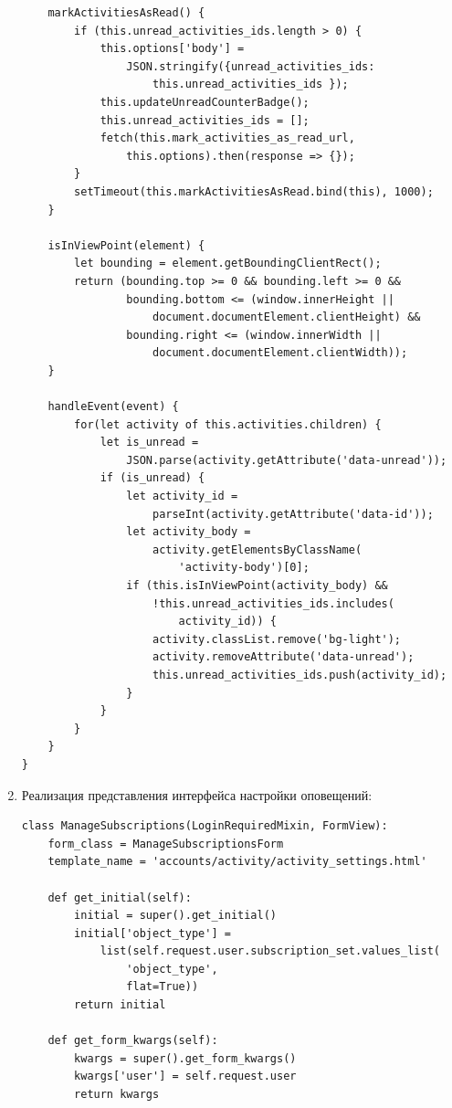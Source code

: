 \documentclass[12pt, a4paper, oneside]{article}
\begin{document}
\begin{enumerate}[wide, labelindent=0pt]
{\begin{verbatim}
    markActivitiesAsRead() {
        if (this.unread_activities_ids.length > 0) {
            this.options['body'] = 
                JSON.stringify({unread_activities_ids: 
                    this.unread_activities_ids });
            this.updateUnreadCounterBadge();
            this.unread_activities_ids = [];
            fetch(this.mark_activities_as_read_url, 
                this.options).then(response => {});
        }
        setTimeout(this.markActivitiesAsRead.bind(this), 1000);
    }

    isInViewPoint(element) {
        let bounding = element.getBoundingClientRect();
        return (bounding.top >= 0 && bounding.left >= 0 &&
                bounding.bottom <= (window.innerHeight || 
                    document.documentElement.clientHeight) &&
                bounding.right <= (window.innerWidth || 
                    document.documentElement.clientWidth));
    }

    handleEvent(event) {
        for(let activity of this.activities.children) {
            let is_unread = 
                JSON.parse(activity.getAttribute('data-unread'));
            if (is_unread) {
                let activity_id = 
                    parseInt(activity.getAttribute('data-id'));
                let activity_body = 
                    activity.getElementsByClassName(
                        'activity-body')[0];
                if (this.isInViewPoint(activity_body) && 
                    !this.unread_activities_ids.includes(
                        activity_id)) {
                    activity.classList.remove('bg-light');
                    activity.removeAttribute('data-unread');
                    this.unread_activities_ids.push(activity_id);
                }
            }
        }
    }
}            
        \end{verbatim}
    }
    \item {
        Реализация представления интерфейса настройки оповещений: \label{code:activity-settings-view}
        \begin{verbatim}
class ManageSubscriptions(LoginRequiredMixin, FormView):
    form_class = ManageSubscriptionsForm
    template_name = 'accounts/activity/activity_settings.html'

    def get_initial(self):
        initial = super().get_initial()
        initial['object_type'] = 
            list(self.request.user.subscription_set.values_list(
                'object_type', 
                flat=True))
        return initial

    def get_form_kwargs(self):
        kwargs = super().get_form_kwargs()
        kwargs['user'] = self.request.user
        return kwargs


\end{verbatim}}
\end{enumerate}
\end{document}

